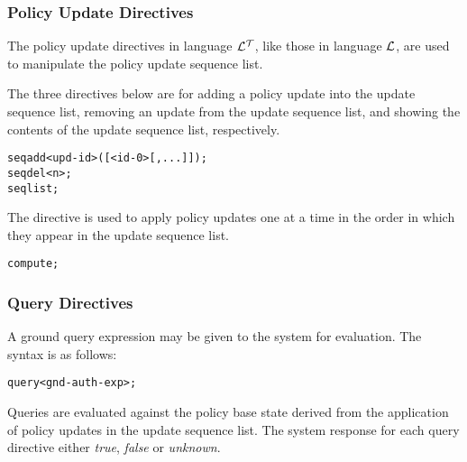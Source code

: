 \documentclass[11pt]{report}
\newenvironment{vverbatim}
{
  \begin{alltt}
}
{
  \vspace{-\baselineskip}
  \end{alltt}
}
\begin{document}
        \subsubsection{Policy Update Directives}

          The policy update directives in language ${\cal L^T}$, like those
          in language ${\cal L}$, are used to manipulate the policy update
          sequence list.

          The three directives below are for adding a policy update into the
          update sequence list, removing an update from the update sequence
          list, and showing the contents of the update sequence list,
          respectively.

          \begin{vverbatim}
  seq add <upd-id>([<id-0>[, ...]]);
  seq del <n>;
  seq list;
          \end{vverbatim}

          The directive is used to apply policy updates one at a time in the
          order in which they appear in the update sequence list.

          \begin{vverbatim}
  compute;
          \end{vverbatim}

        \subsubsection{Query Directives}

          A ground query expression may be given to the system for evaluation.
          The syntax is as follows:

          \begin{vverbatim}
  query <gnd-auth-exp>;
          \end{vverbatim}

          Queries are evaluated against the policy base state derived from the
          application of policy updates in the update sequence list. The system
          response for each query directive either {\em true}, {\em false} or
          {\em unknown}.
\end{document}
